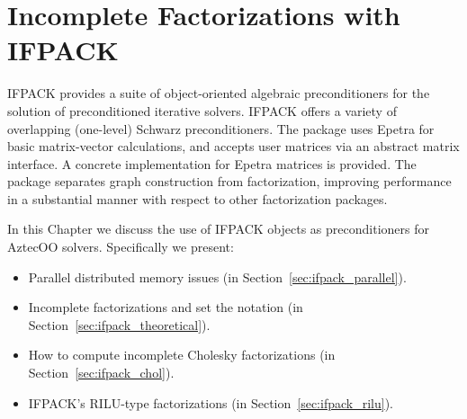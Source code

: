 % 
% 
% 
%  
%  
% 

\chapter{Incomplete Factorizations with IFPACK}
\label{chap:ifpack}


\begin{introchapter}
IFPACK provides a suite of object-oriented algebraic preconditioners for
the solution of preconditioned iterative solvers. IFPACK offers a
variety of overlapping (one-level) Schwarz preconditioners. The package
uses Epetra for basic matrix-vector calculations, and accepts user
matrices via an abstract matrix interface. A concrete implementation for
Epetra matrices is provided. The package separates graph construction
from factorization, improving performance in a substantial manner with
respect to other factorization packages.

In this Chapter we discuss the use of IFPACK objects as preconditioners for
AztecOO solvers.  Specifically we present:
\begin{itemize}
\item Parallel distributed memory issues (in Section~\ref{sec:ifpack_parallel}).
\item Incomplete factorizations and set the
  notation (in Section~\ref{sec:ifpack_theoretical}).
\item How to compute incomplete Cholesky factorizations (in
  Section~\ref{sec:ifpack_chol}).
\item IFPACK's RILU-type factorizations (in
  Section~\ref{sec:ifpack_rilu}).
\end{itemize}
\end{introchapter}

